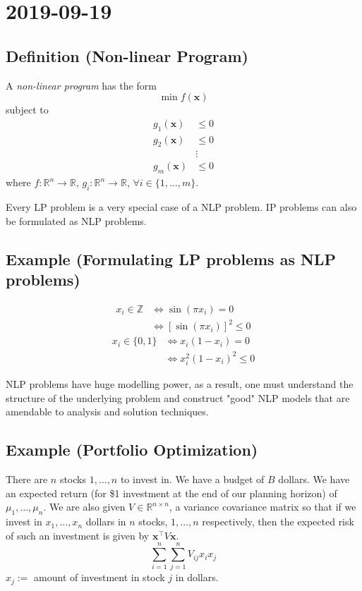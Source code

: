 \section{2019-09-19}
\begin{defbox}
    \subsection{Definition (Non-linear Program)}
    A \emph{non-linear program} has the form
    \[\min f(\bm{x})\]
subject to
\begin{align*}
    g_1(\bm{x})&\le 0\\
    g_2(\bm{x})&\le 0\\
    &\vdots\\
    g_m(\bm{x})&\le 0
\end{align*}
where
$f:\mathbb{R}^n\rightarrow \mathbb{R}$, 
$g_i:\mathbb{R}^n\rightarrow\mathbb{R}$, $\forall i\in\{1,\dots,m\}$.
\end{defbox}

Every LP problem is a very special case of a NLP problem. IP problems can
also be formulated as NLP problems.
\subsection{Example (Formulating LP problems as NLP problems)}
\begin{align*}
    x_i\in\mathbb{Z}&\iff \sin(\pi x_i)=0\\
    &\iff [\sin(\pi x_i)]^2\le 0
\end{align*}
\begin{align*}
    x_i\in \{0,1\}&\iff x_i(1-x_i)=0\\
    &\iff x_i^2(1-x_i)^2\le 0
\end{align*}

NLP problems have huge modelling power, as a result, one must understand the
structure of the underlying problem and construct "good" NLP models that are
amendable to analysis and solution techniques.

\subsection{Example (Portfolio Optimization)}
There are $n$ stocks $1,\dots,n$ to invest in. We have a budget of $B$ dollars.
We have an expected return (for \$1 investment at the end of our planning
horizon) of $\mu_1,\dots,\mu_n$. We are also given 
$V\in \mathbb{R}^{n\times n}$, a variance covariance matrix so that if
we invest in $x_1,\dots,x_n$ dollars in $n$ stocks, $1,\dots,n$ respectively,
then the expected risk of such an investment is given by 
$\bm{x}^\top  V\bm{x}$.
\[\sum\limits_{i = 1}^{n}\sum\limits_{j = 1}^{n}V_{ij}x_ix_j\]
$x_j:=$ amount of investment in stock $j$ in dollars.

